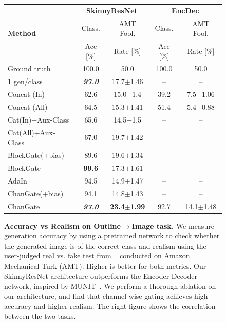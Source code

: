 \begin{figure}[ht!]
  \centering
  \begin{minipage}[t]{\linewidth}  
  \centering
  \resizebox{1.\linewidth}{!} {
  \setlength{\tabcolsep}{6pt}
  \begin{tabular}{l c c c c}
  \toprule
    \multirow{3}{*}{\textbf{Method}} & \multicolumn{2}{c}{ {\bf SkinnyResNet}} & \multicolumn{2}{c}{ {\bf EncDec}} \\ \cmidrule(l){2-3} \cmidrule(l){4-5}
	& Class. & AMT Fool. & Class. & AMT Fool. \\
	& Acc [\%] & Rate [\%] & Acc [\%] & Rate [\%] \\ \midrule
    Ground truth & 100.0 & 50.0 & 100.0 & 50.0 \\ \midrule
    1 gen/class & \textbf{\textit{97.0}} & 17.7$\pm$1.46 & -- & -- \\ \midrule
    Concat (In)	& 62.6 & 15.0$\pm$1.4 & 39.2 & 7.5$\pm$1.06 \\ 
    Concat (All) & 64.5 & 15.3$\pm$1.41 & 51.4 & 5.4$\pm$0.88 \\ \midrule
    Cat(In)+Aux-Class & 65.6 & 14.5$\pm$1.5 & -- & -- \\ 
    Cat(All)+Aux-Class & 67.0 & 19.7$\pm$1.42 & -- & --\\ \midrule
    BlockGate(+bias) & 89.6 & 19.6$\pm$1.34 & -- & --\\ 
    BlockGate & {\bf 99.6} & 17.3$\pm$1.61 & -- & --\\ 
    AdaIn & 94.5 & 14.9$\pm$1.47 & -- & --\\ 
    ChanGate(+bias) & 94.1 & 14.8$\pm$1.43 & -- & --\\ 
    ChanGate & \textbf{\textit{97.0}} & {\bf 23.4$\pm$1.99} & 92.7 & 14.1$\pm$1.48 \\ 
	\hline
	\end{tabular} } 
  \end{minipage}\begin{minipage}[]{0.49\linewidth}
  \centering
  \end{minipage}
  \caption{\small {\bf Accuracy vs Realism on Outline$\rightarrow$Image task.} We measure generation accuracy by using a pretrained network to check whether the generated image is of the correct class and realism using the user-judged real vs. fake test from ~\cite{zhang2016colorful,isola2016image2image} conducted on Amazon Mechanical Turk (AMT). Higher is better for both metrics. Our SkinnyResNet architecture outperforms the Encoder-Decoder network, inspired by MUNIT~\cite{huang2018multimodal}. We perform a thorough ablation on our architecture, and find that channel-wise gating achieves high accuracy and higher realism. The right figure shows the correlation between the two tasks.
  \vspace{-4mm}
  }
  \vspace{-3mm}
  \label{fig:acc_vs_real}
\end{figure}


